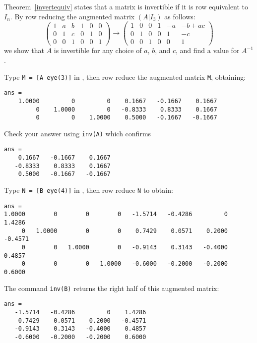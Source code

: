\soln Theorem~\ref{invertequiv} states that a matrix is invertible if
it is row equivalent to $I_n$.  By row reducing the augmented matrix
$(A|I_3)$ as follows:
\[
\left(\begin{array}{rrr|rrr} 1 & a & b & 1 & 0 & 0 \\
0 & 1 & c & 0 & 1 & 0 \\ 0 & 0 & 1 & 0 & 0 & 1
\end{array}\right) \rightarrow \left(\begin{array}{rrr|rrc}
1 & 0 & 0 & 1 & -a & -b + ac \\ 0 & 1 & 0 & 0 & 1 & -c \\
0 & 0 & 1 & 0 & 0 & 1 \end{array}\right)
\]
we show that $A$ is invertible for any choice of $a$, $b$, and
$c$, and find a value for $A^{-1}$.

Type {\tt M = [A eye(3)]} in \Matlabp, then row reduce the augmented 
matrix {\tt M}, obtaining:
\begin{verbatim}
ans =
    1.0000         0         0    0.1667   -0.1667    0.1667
         0    1.0000         0   -0.8333    0.8333    0.1667
         0         0    1.0000    0.5000   -0.1667   -0.1667
\end{verbatim}
Check your answer using {\tt inv(A)} which confirms
\begin{verbatim}
ans =
    0.1667   -0.1667    0.1667
   -0.8333    0.8333    0.1667
    0.5000   -0.1667   -0.1667
\end{verbatim}

Type {\tt N = [B eye(4)]} in \Matlabp, then row reduce {\tt N} to obtain:
\begin{verbatim}
ans =
1.0000        0        0        0   -1.5714   -0.4286         0    1.4286
     0   1.0000        0        0    0.7429    0.0571    0.2000   -0.4571
     0        0   1.0000        0   -0.9143    0.3143   -0.4000    0.4857
     0        0        0   1.0000   -0.6000   -0.2000   -0.2000    0.6000
\end{verbatim}
The command {\tt inv(B)} returns the right half of this augmented
matrix:
\begin{verbatim}
ans =
   -1.5714   -0.4286         0    1.4286
    0.7429    0.0571    0.2000   -0.4571
   -0.9143    0.3143   -0.4000    0.4857
   -0.6000   -0.2000   -0.2000    0.6000
\end{verbatim}

